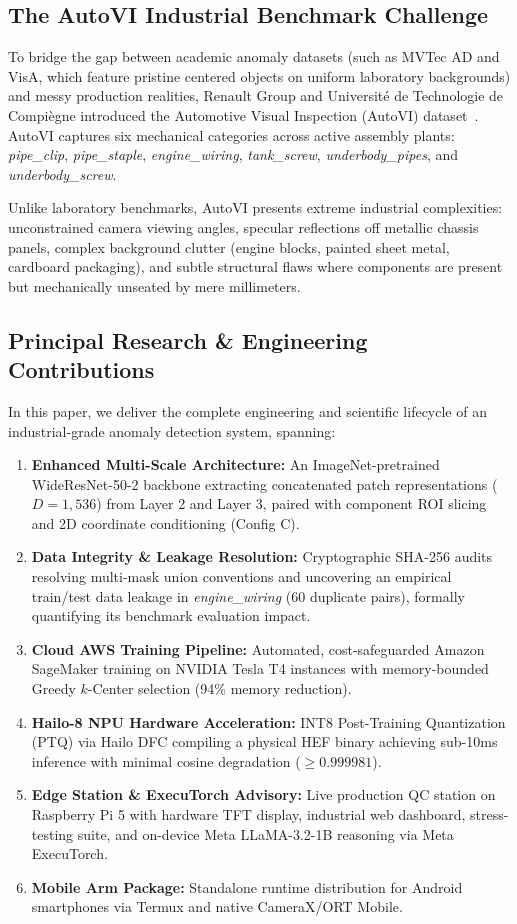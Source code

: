 \documentclass[journal,twocolumn]{IEEEtran}
\begin{document}
\subsection{The AutoVI Industrial Benchmark Challenge}
To bridge the gap between academic anomaly datasets (such as MVTec AD and VisA, which feature pristine centered objects on uniform laboratory backgrounds) and messy production realities, Renault Group and Université de Technologie de Compiègne introduced the Automotive Visual Inspection (AutoVI) dataset~\cite{carvalho2024autovi}. AutoVI captures six mechanical categories across active assembly plants: \textit{pipe\_clip}, \textit{pipe\_staple}, \textit{engine\_wiring}, \textit{tank\_screw}, \textit{underbody\_pipes}, and \textit{underbody\_screw}.

Unlike laboratory benchmarks, AutoVI presents extreme industrial complexities: unconstrained camera viewing angles, specular reflections off metallic chassis panels, complex background clutter (engine blocks, painted sheet metal, cardboard packaging), and subtle structural flaws where components are present but mechanically unseated by mere millimeters.

\subsection{Principal Research \& Engineering Contributions}
In this paper, we deliver the complete engineering and scientific lifecycle of an industrial-grade anomaly detection system, spanning:
\begin{enumerate}
    \item \textbf{Enhanced Multi-Scale Architecture:} An ImageNet-pretrained WideResNet-50-2 backbone extracting concatenated patch representations ($D = 1,536$) from Layer 2 and Layer 3, paired with component ROI slicing and 2D coordinate conditioning (Config C).
    \item \textbf{Data Integrity \& Leakage Resolution:} Cryptographic SHA-256 audits resolving multi-mask union conventions and uncovering an empirical train/test data leakage in \textit{engine\_wiring} (60 duplicate pairs), formally quantifying its benchmark evaluation impact.
    \item \textbf{Cloud AWS Training Pipeline:} Automated, cost-safeguarded Amazon SageMaker training on NVIDIA Tesla T4 instances with memory-bounded Greedy $k$-Center selection (94\% memory reduction).
    \item \textbf{Hailo-8 NPU Hardware Acceleration:} INT8 Post-Training Quantization (PTQ) via Hailo DFC compiling a physical HEF binary achieving sub-10ms inference with minimal cosine degradation ($\ge 0.999981$).
    \item \textbf{Edge Station \& ExecuTorch Advisory:} Live production QC station on Raspberry Pi 5 with hardware TFT display, industrial web dashboard, stress-testing suite, and on-device Meta LLaMA-3.2-1B reasoning via Meta ExecuTorch.
    \item \textbf{Mobile Arm Package:} Standalone runtime distribution for Android smartphones via Termux and native CameraX/ORT Mobile.
\end{enumerate}
\end{document}
